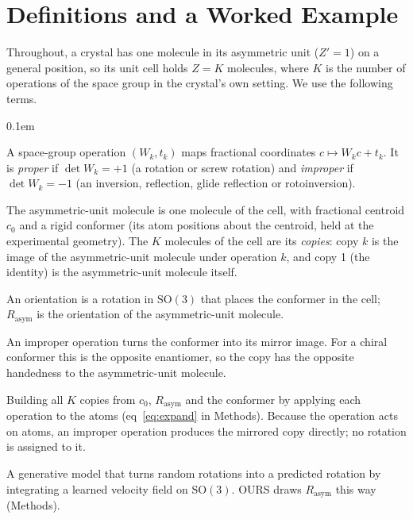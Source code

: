 \documentclass[journal=acsodf,manuscript=article]{achemso}
\begin{document}
\section{Definitions and a Worked Example}
Throughout, a crystal has one molecule in its asymmetric unit ($Z'=1$) on a general
position, so its unit cell holds $Z=K$ molecules, where $K$ is the number of operations of
the space group in the crystal's own setting. We use the following terms.
\begin{description}\itemsep0.1em
\item[Operation.] A space-group operation $(W_k,t_k)$ maps fractional coordinates
$c\mapsto W_kc+t_k$. It is \emph{proper} if $\det W_k=+1$ (a rotation or screw rotation)
and \emph{improper} if $\det W_k=-1$ (an inversion, reflection, glide reflection or
rotoinversion).
\item[Asymmetric-unit molecule and copies.] The asymmetric-unit molecule is one molecule
of the cell, with fractional centroid $c_0$ and a rigid conformer (its atom positions
about the centroid, held at the experimental geometry). The $K$ molecules of the cell are
its \emph{copies}: copy $k$ is the image of the asymmetric-unit molecule under operation
$k$, and copy 1 (the identity) is the asymmetric-unit molecule itself.
\item[Orientation and $R_{\text{asym}}$.] An orientation is a rotation in $\mathrm{SO}(3)$
that places the conformer in the cell; $R_{\text{asym}}$ is the orientation of the
asymmetric-unit molecule.
\item[Handedness.] An improper operation turns the conformer into its mirror image. For a
chiral conformer this is the opposite enantiomer, so the copy has the opposite handedness to
the asymmetric-unit molecule.
\item[Exact expansion.] Building all $K$ copies from $c_0$, $R_{\text{asym}}$ and the
conformer by applying each operation to the atoms (eq~\ref{eq:expand} in Methods). Because
the operation acts on atoms, an improper operation produces the mirrored copy directly; no
rotation is assigned to it.
\item[Orientation flow.] A generative model that turns random rotations into a predicted
rotation by integrating a learned velocity field on $\mathrm{SO}(3)$. OURS draws
$R_{\text{asym}}$ this way (Methods).
\end{description}
\end{document}
